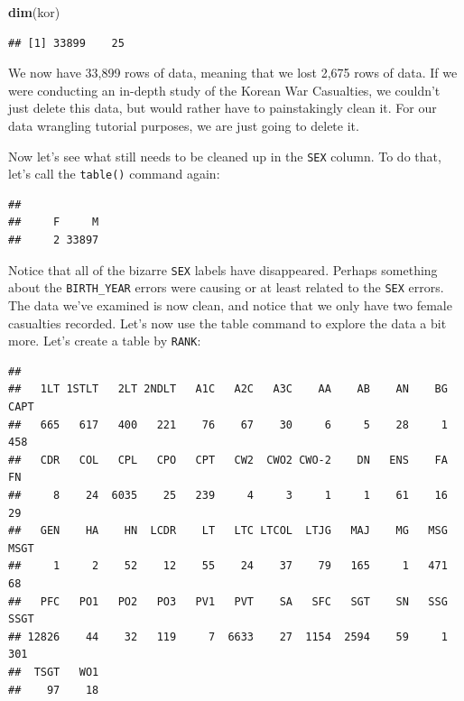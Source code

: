 \documentclass[]{book}
\newenvironment{Shaded}{\begin{snugshade}}{\end{snugshade}}
\newcommand{\KeywordTok}[1]{\textcolor[rgb]{0.13,0.29,0.53}{\textbf{{#1}}}}
\newcommand{\NormalTok}[1]{{#1}}
\begin{document}
\begin{Shaded}
\begin{Highlighting}[]
\KeywordTok{dim}\NormalTok{(kor)}
\end{Highlighting}
\end{Shaded}

\begin{verbatim}
## [1] 33899    25
\end{verbatim}

We now have 33,899 rows of data, meaning that we lost 2,675 rows of
data. If we were conducting an in-depth study of the Korean War
Casualties, we couldn't just delete this data, but would rather have to
painstakingly clean it. For our data wrangling tutorial purposes, we are
just going to delete it.

Now let's see what still needs to be cleaned up in the \texttt{SEX}
column. To do that, let's call the \texttt{table()} command again:

\begin{Shaded}
\end{Shaded}

\begin{verbatim}
## 
##     F     M 
##     2 33897
\end{verbatim}

Notice that all of the bizarre \texttt{SEX} labels have disappeared.
Perhaps something about the \texttt{BIRTH\_YEAR} errors were causing or
at least related to the \texttt{SEX} errors. The data we've examined is
now clean, and notice that we only have two female casualties recorded.
Let's now use the table command to explore the data a bit more. Let's
create a table by \texttt{RANK}:

\begin{Shaded}
\end{Shaded}

\begin{verbatim}
## 
##   1LT 1STLT   2LT 2NDLT   A1C   A2C   A3C    AA    AB    AN    BG  CAPT 
##   665   617   400   221    76    67    30     6     5    28     1   458 
##   CDR   COL   CPL   CPO   CPT   CW2  CWO2 CWO-2    DN   ENS    FA    FN 
##     8    24  6035    25   239     4     3     1     1    61    16    29 
##   GEN    HA    HN  LCDR    LT   LTC LTCOL  LTJG   MAJ    MG   MSG  MSGT 
##     1     2    52    12    55    24    37    79   165     1   471    68 
##   PFC   PO1   PO2   PO3   PV1   PVT    SA   SFC   SGT    SN   SSG  SSGT 
## 12826    44    32   119     7  6633    27  1154  2594    59     1   301 
##  TSGT   WO1 
##    97    18
\end{verbatim}
\end{document}
